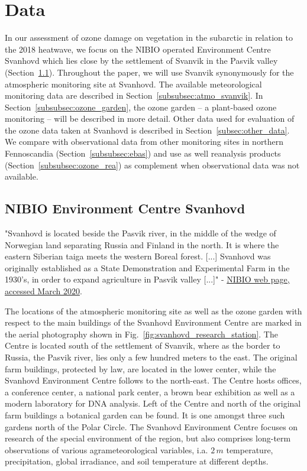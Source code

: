 \documentclass[bg, manuscript]{copernicus}
\begin{document}
\section{Data}
\label{sec:data}

In our assessment of ozone damage on vegetation in the subarctic in relation to the 2018 heatwave, we focus on the NIBIO operated Environment Centre Svanhovd which lies close by the settlement of Svanvik in the Pasvik valley (Section~\ref{subsec:svanhovd}). Throughout the paper, we will use Svanvik synonymously for the atmospheric monitoring site at Svanhovd. The available meteorological monitoring data are described in Section~\ref{subsubsec:atmo_svanvik}. In Section~\ref{subsubsec:ozone_garden}, the ozone garden -- a plant-based ozone monitoring -- will be described in more detail. Other data used for evaluation of the ozone data taken at Svanhovd is described in Section~\ref{subsec:other_data}. We compare with observational data from other monitoring sites in northern Fennoscandia (Section~\ref{subsubsec:ebas}) and use as well reanalysis products (Section~\ref{subsubsec:ozone_rea}) as complement when observational data was not available.

\subsection{NIBIO Environment Centre Svanhovd}
\label{subsec:svanhovd}
"Svanhovd is located beside the Pasvik river, in the middle of the wedge of Norwegian land separating Russia and Finland in the north. It is where the eastern Siberian taiga meets the western Boreal forest. [...] Svanhovd was originally established as a State Demonstration and Experimental Farm in the 1930's, in order to expand agriculture in Pasvik valley [...]" - \href{https://www.nibio.no/en/about-eng/addresses/northern-norway/svanhovd}{NIBIO web page, accessed March 2020}.

The locations of the atmospheric monitoring site as well as the ozone garden with respect to the main buildings of the Svanhovd Environment Centre are marked in the aerial photography shown in Fig.~\ref{fig:svanhovd_research_station}. The Centre is located south of the settlement of Svanvik, where as the border to Russia, the Pasvik river, lies only a few hundred meters to the east. The original farm buildings, protected by law, are located in the lower center, while the Svanhovd Environment Centre follows to the north-east. The Centre hosts offices, a conference center, a national park center, a brown bear exhibition as well as a modern laboratory for DNA analysis. Left of the Centre and north of the original farm buildings a botanical garden can be found. It is one amongst three such gardens north of the Polar Circle. The Svanhovd Environment Centre focuses on research of the special environment of the region, but also comprises long-term observations of various agrameteorological variables, i.a. $2\,\unit{m}$ temperature, precipitation, global irradiance, and soil temperature at different depths.
\end{document}
